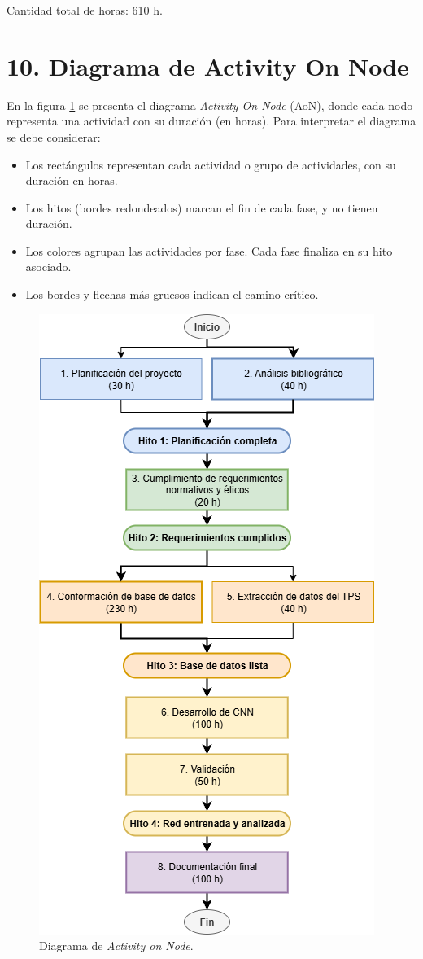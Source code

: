\documentclass[
11pt, %
codirector, %
]{charter}
\begin{document}
Cantidad total de horas: 610 h.

\section{10. Diagrama de Activity On Node}
\label{sec:AoN}

En la figura \ref{fig:AoN} se presenta el diagrama \textit{Activity On Node} (AoN), donde cada nodo representa una actividad con su duración (en horas). Para interpretar el diagrama se debe considerar:
\begin{itemize}
	\item Los rectángulos representan cada actividad o grupo de actividades, con su duración en horas.
	\item Los hitos (bordes redondeados) marcan el fin de cada fase, y no tienen duración.
	\item Los colores agrupan las actividades por fase. Cada fase finaliza en su hito asociado.
	\item Los bordes y flechas más gruesos indican el camino crítico.
\end{itemize}

\begin{figure}[htpb]
\centering 
\includegraphics[width=.7\textwidth]{./Figuras/ActivityOnNode.png}
\caption{Diagrama de \textit{Activity on Node}.}
\label{fig:AoN}
\end{figure}
\end{document}
